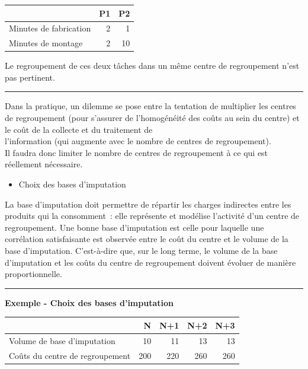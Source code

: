 \documentclass{tufte-handout}
\begin{document}
\begin{enumerate}
\begin{center}
\begin{tabular}{lrr}
 & P1 & P2\\
\hline
Minutes de fabrication & 2 & 1\\
Minutes de montage & 2 & 10\\
\end{tabular}
\end{center}

Le regroupement de ces deux tâches dans un même centre de regroupement n'est pas pertinent.\\

\noindent\rule{\textwidth}{0.5pt}

Dans la pratique, un dilemme se pose entre la tentation de multiplier les centres de regroupement (pour s'assurer de l'homogénéité des coûts au sein du centre) et le coût de la collecte et du traitement de\\
l'information (qui augmente avec le nombre de centres de regroupement).\\
Il faudra donc limiter le nombre de centres de regroupement à ce qui est réellement nécessaire.\\

\begin{itemize}
\item Choix des bases d'imputation\\
\end{itemize}
La base d'imputation doit permettre de répartir les charges indirectes entre les produits qui la consomment : elle représente et modélise l'activité d'un centre de regroupement. Une bonne base d'imputation est celle pour laquelle une corrélation satisfaisante est observée entre le coût du centre et le volume de la base d'imputation. C'est-à-dire que, sur le long terme, le volume de la base d'imputation et les coûts du centre de regroupement doivent évoluer de manière proportionnelle.\\

\noindent\rule{\textwidth}{0.5pt}
\textbf{Exemple - Choix des bases d'imputation}\\

\begin{center}
\begin{tabular}{lrrrr}
 & N & N+1 & N+2 & N+3\\
\hline
Volume de base d'imputation & 10 & 11 & 13 & 13\\
Coûts du centre de regroupement & 200 & 220 & 260 & 260\\
\end{tabular}
\end{center}


\end{enumerate}
\end{document}

